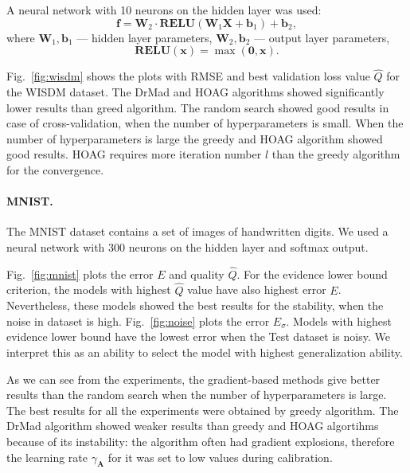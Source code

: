 \documentclass[12pt]{article}
\begin{document}
A neural network with 10 neurons on the hidden layer was used:
\[
    \mathbf{f} = \mathbf{W}_2 \cdot \textbf{RELU}(\mathbf{W}_1\mathbf{X} + \mathbf{b}_1) +\mathbf{b}_2,
\]
where $\mathbf{W}_1, \mathbf{b}_1$ --- hidden layer parameters,
$\mathbf{W}_2, \mathbf{b}_2$ --- output layer parameters,
\[
    \textbf{RELU}(\mathbf{x}) = \max(\mathbf{0}, \mathbf{x}).
\]

Fig.~\ref{fig:wisdm} shows the plots with RMSE and best validation loss value $\hat{Q}$ for the WISDM dataset.
The DrMad and HOAG algorithms showed significantly lower results than greed algorithm. The random search showed good results in case of cross-validation, when the number of hyperparameters is small. When the number of hyperparameters is large the greedy and HOAG algorithm showed good results. HOAG requires more iteration number $l$ than the greedy algorithm for the convergence.


\paragraph{MNIST.}
The MNIST dataset contains a set of images of handwritten digits. 
We used a neural network with 300 neurons on the hidden layer and softmax output.


Fig.~\ref{fig:mnist} plots the error $E$ and quality $\hat{Q}$.
For the evidence lower bound criterion, the models with highest $\hat{Q}$ value have also highest error $E$. Nevertheless, 
these models showed the best results for the stability, when the noise in dataset is high. Fig.~\ref{fig:noise} plots  the error $E_\sigma$. Models with highest evidence lower bound have the lowest error when the Test dataset is noisy. We interpret this as an ability to select the model with highest generalization ability.

As we can see from the experiments, the gradient-based methods give better results than the random search when the number of hyperparameters is large. The best results for all the experiments were obtained by greedy algorithm. The DrMad algorithm showed weaker results than greedy and HOAG algortihms because of its instability: the algorithm often had gradient explosions, therefore the learning rate $\gamma_{\mathbf{A}}$ for it was set to low values during calibration. 
\end{document}

